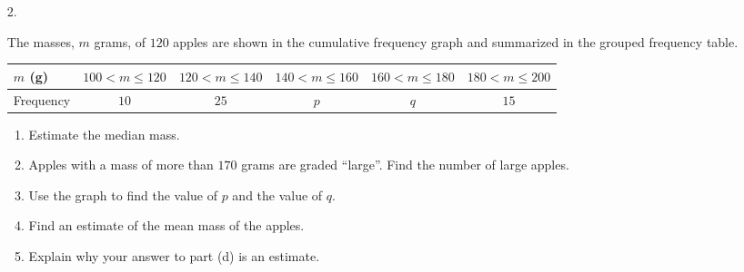 \documentclass[12pt, twoside]{article}
\begin{document}
\begin{enumerate}[itemsep=0.15cm]

\newpage

\item[2.]

The masses, $m$ grams, of $120$ apples are shown in the cumulative
frequency graph and summarized in the grouped frequency table.

\begin{center}
\end{center}

\begin{center}
\small\setlength{\tabcolsep}{2.5pt}\renewcommand{\arraystretch}{1.25}
\begin{tabular}{|l|c|c|c|c|c|}
\hline
$m$ (g) & $100 < m \le 120$ & $120 < m \le 140$ & $140 < m \le 160$
& $160 < m \le 180$ & $180 < m \le 200$ \\
\hline
Frequency & $10$ & $25$ & $p$ & $q$ & $15$ \\
\hline
\end{tabular}
\end{center}

\begin{enumerate}[itemsep=0.02cm]
  \item Estimate the median mass.
  \item Apples with a mass of more than $170$ grams are graded
  ``large''. Find the number of large apples.
  \item Use the graph to find the value of $p$ and the value of $q$.
  \item Find an estimate of the mean mass of the apples.
  \item Explain why your answer to part (d) is an estimate.
\end{enumerate}


\end{enumerate}
\end{document}
